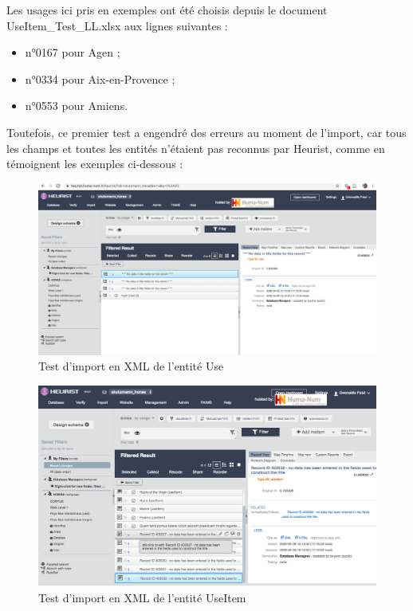 \documentclass[a4paper,12pt,twoside]{book}
\begin{document}
Les usages ici pris en exemples ont été choisis depuis le document UseItem\_Test\_LL.xlsx aux lignes suivantes :
\begin{itemize}
    \item n°0167 pour Agen ;
    \item n°0334 pour Aix-en-Provence ;
    \item n°0553 pour Amiens.
\end{itemize}

Toutefois, ce premier test a engendré des erreurs au moment de l'import, car tous les champs et toutes les entités n'étaient pas reconnus par Heurist, comme en témoignent les exemples ci-dessous : 

    \begin{figure}[!h]
    \centering
    \includegraphics[width=15cm]{img/Import_Donnees/resultatTestXML1Use.png}
    \caption{Test d'import en XML de l'entité Use}
    \end{figure}
    \clearpage
    
    \begin{figure}[!h]
    \centering
    \includegraphics[width=15cm]{img/Import_Donnees/ImportTestXMLUseItem1.png}
    \caption{Test d'import en XML de l'entité UseItem}
    \end{figure}
    \clearpage
    
\end{document}
